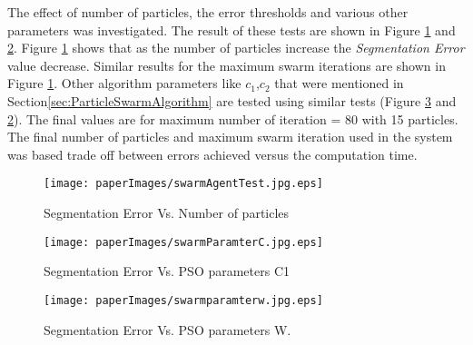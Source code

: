 	 	
 The effect of number of particles, the error thresholds and various other parameters was investigated. The result of these tests are shown in Figure \ref{fig:swarmtesting} and \ref{fig:swarmtesting2}. Figure \ref{fig:swarmtesting} shows that as the number of particles increase the \textit{Segmentation Error} value decrease. Similar results for the maximum swarm iterations are shown in Figure \ref{fig:swarmtesting}.  Other algorithm parameters like $c_1$,$c_2$ that were mentioned in Section\ref{sec:ParticleSwarmAlgorithm} are tested using similar tests (Figure \ref{fig:swarmparamterw.jpg} and \ref{fig:swarmtesting2}). The final values are for maximum number of iteration = 80 with 15 particles. The final number of particles and maximum swarm iteration used in the system was based trade off between errors achieved versus the computation time. 
   
   
    
 \begin{figure}
	\centering		
	 \texttt{[image: paperImages/swarmAgentTest.jpg.eps]}
	 	\caption{Segmentation Error Vs. Number of particles}
	 	\label{fig:swarmtesting}
\end{figure} 

\begin{figure}
	\centering		
	 \texttt{[image: paperImages/swarmParamterC.jpg.eps]}
	 	\caption{Segmentation Error Vs. PSO parameters C1}
	 	\label{fig:swarmtesting2}
	
\end{figure} 


\begin{figure}
	\centering
		\texttt{[image: paperImages/swarmparamterw.jpg.eps]}
	\caption{Segmentation Error Vs. PSO parameters W.}
	\label{fig:swarmparamterw.jpg}
\end{figure}



